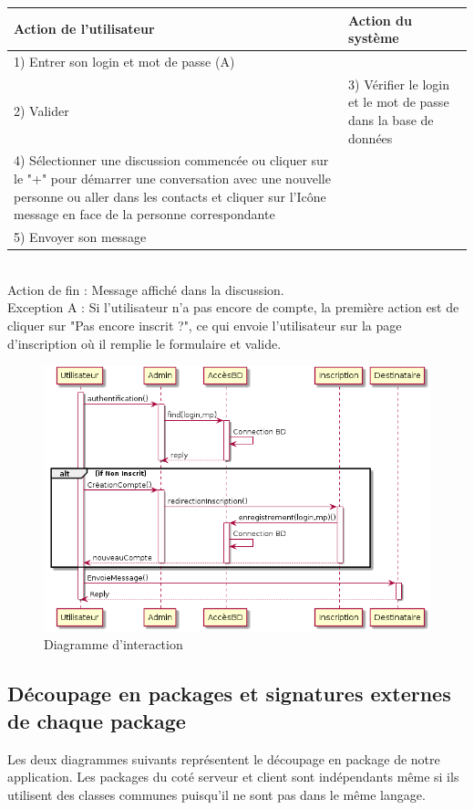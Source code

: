 	\begin{tabular}{|p{7cm}|p{7cm}|}
		\hline
		Action de l'utilisateur & Action du système\tabularnewline
		\hline

		\hline
		1) Entrer son login et mot de passe (A)  & \tabularnewline

		\hline
		2) Valider  & 3) Vérifier le login et le mot de passe dans la base de données\tabularnewline

		\hline
		4) Sélectionner une discussion commencée ou cliquer sur le "+" pour	démarrer une conversation avec une nouvelle personne ou aller dans les contacts et cliquer sur l’Icône message en face de la personne correspondante & \tabularnewline

		\hline
		5) Envoyer son message  & \tabularnewline
		\hline
	\end{tabular}

~\\

	Action de fin  : Message affiché dans la discussion. \\

	Exception A : Si l'utilisateur n'a pas encore de compte, la première action est de cliquer sur "Pas encore inscrit ?", ce qui envoie l'utilisateur sur la page d'inscription où il remplie le formulaire et valide.

	\begin{figure}[H]
		\centerline{\includegraphics[width=12.5cm]{img/interaction.png}}
		\caption{Diagramme d’interaction}
	\end{figure}

	\newpage

	\subsection{Découpage en packages et signatures externes de chaque package}
	Les deux diagrammes suivants représentent le découpage en package de notre application.
	Les packages du coté serveur et client sont indépendants même si ils utilisent des classes communes puisqu'il ne sont pas dans le même langage.

